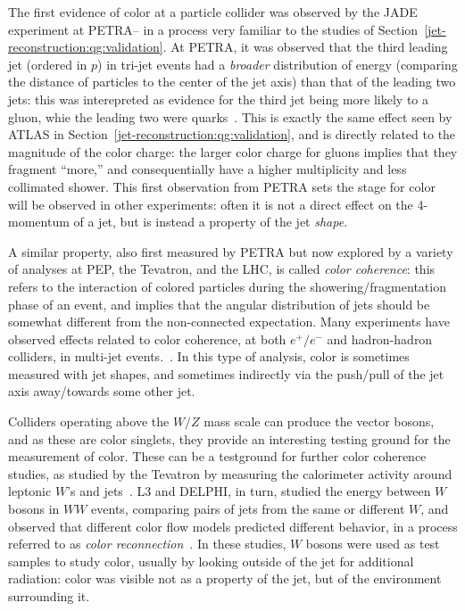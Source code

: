 The first evidence of color at a particle collider was observed by the JADE experiment at PETRA-- in a process very familiar to the studies of Section~\ref{jet-reconstruction:qg:validation}. At PETRA, it was observed that the third leading jet (ordered in $p$) in tri-jet events had a \textit{broader} distribution of energy (comparing the distance of particles to the center of the jet axis) than that of the leading two jets: this was interepreted as evidence for the third jet being more likely to a gluon, whie the leading two were quarks~\cite{Bartel:1983ii}. This is exactly the same effect seen by ATLAS in Section~\ref{jet-reconstruction:qg:validation}, and is directly related to the magnitude of the color charge: the larger color charge for gluons implies that they fragment ``more,'' and consequentially have a higher multiplicity and less collimated shower. This first observation from PETRA sets the stage for color will be observed in other experiments: often it is not a direct effect on the 4-momentum of a jet, but is instead a property of the jet \textit{shape}. 

A similar property, also first measured by PETRA but now explored by a variety of analyses at PEP, the Tevatron, and the LHC, is called \textit{color coherence}: this refers to the interaction of colored particles during the showering/fragmentation phase of an event, and implies that the angular distribution of jets should be somewhat different from the non-connected expectation. Many experiments have observed effects related to color coherence, at both $e^+/e^-$ and hadron-hadron colliders, in multi-jet events.~\cite{tasso,pep,PhysRevLett54270,PhysRevLett57945,PhysRevLett571398,PhysRevD.50.5562,Abbott:1997bk,Chatrchyan:2013fha}. In this type of analysis, color is sometimes measured with jet shapes, and sometimes indirectly via the push/pull of the jet axis away/towards some other jet.

Colliders operating above the $W/Z$ mass scale can produce the vector bosons, and as these are color singlets, they provide an interesting testing ground for the measurement of color. These can be a testground for further color coherence studies, as studied by the Tevatron by measuring the calorimeter activity around leptonic $W$'s and jets~\cite{Abbott:1999cu}.  L3 and DELPHI, in turn, studied the energy between $W$ bosons in $WW$ events, comparing pairs of jets from the same or different $W$, and observed that different color flow models predicted different behavior, in a process referred to as \textit{color reconnection}~\cite{Achard:2003pe,Abdallah:2006uq}. In these studies, $W$ bosons were used as test samples to study color, usually by looking outside of the jet for additional radiation: color was visible not as a property of the jet, but of the environment surrounding it.

